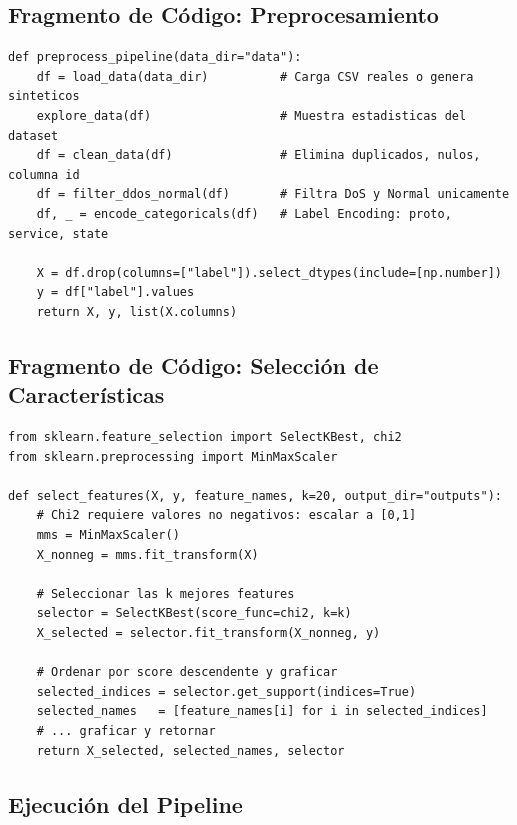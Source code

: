 \documentclass[12pt,a4paper]{article}
\begin{document}
\subsection{Fragmento de Código: Preprocesamiento}

\begin{lstlisting}[style=pythonstyle, caption={Pipeline de preprocesamiento (preprocessing.py)}]
def preprocess_pipeline(data_dir="data"):
    df = load_data(data_dir)          # Carga CSV reales o genera sinteticos
    explore_data(df)                  # Muestra estadisticas del dataset
    df = clean_data(df)               # Elimina duplicados, nulos, columna id
    df = filter_ddos_normal(df)       # Filtra DoS y Normal unicamente
    df, _ = encode_categoricals(df)   # Label Encoding: proto, service, state

    X = df.drop(columns=["label"]).select_dtypes(include=[np.number])
    y = df["label"].values
    return X, y, list(X.columns)
\end{lstlisting}

\subsection{Fragmento de Código: Selección de Características}

\begin{lstlisting}[style=pythonstyle, caption={Selección de características con chi-cuadrado (feature\_selection.py)}]
from sklearn.feature_selection import SelectKBest, chi2
from sklearn.preprocessing import MinMaxScaler

def select_features(X, y, feature_names, k=20, output_dir="outputs"):
    # Chi2 requiere valores no negativos: escalar a [0,1]
    mms = MinMaxScaler()
    X_nonneg = mms.fit_transform(X)

    # Seleccionar las k mejores features
    selector = SelectKBest(score_func=chi2, k=k)
    X_selected = selector.fit_transform(X_nonneg, y)

    # Ordenar por score descendente y graficar
    selected_indices = selector.get_support(indices=True)
    selected_names   = [feature_names[i] for i in selected_indices]
    # ... graficar y retornar
    return X_selected, selected_names, selector
\end{lstlisting}

\subsection{Ejecución del Pipeline}
\end{document}
